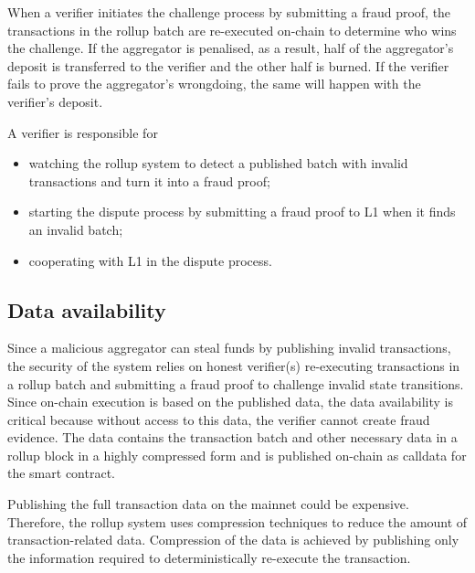 \documentclass{article}
\begin{document}
When a verifier initiates the challenge process by submitting a fraud proof, the transactions in the rollup batch are re-executed on-chain to determine who wins the challenge. If the aggregator is penalised, as a result, half of the aggregator's deposit is transferred to the verifier and the other half is burned. If the verifier fails to prove the aggregator's wrongdoing, the same will happen with the verifier's deposit.

A verifier is responsible for
\begin{itemize} 
\item watching the rollup system to detect a published batch with invalid transactions and turn it into a fraud proof;
\item starting the dispute process by submitting a fraud proof to L1 when it finds an invalid batch; 
\item cooperating with L1 in the dispute process.
\end{itemize}

\subsection{Data availability}
Since a malicious aggregator can steal funds by publishing invalid transactions, the security of the system relies on honest verifier(s) re-executing transactions in a rollup batch and submitting a fraud proof to challenge invalid state transitions. Since on-chain execution is based on the published data, the data availability is critical because without access to this data, the verifier cannot create fraud evidence. The data contains the transaction batch and other necessary data in a rollup block in a highly compressed form and is published on-chain as calldata for the smart contract.

Publishing the full transaction data on the mainnet could be expensive. Therefore, the rollup system uses compression techniques to reduce the amount of transaction-related data. Compression of the data is achieved by publishing only the information required to deterministically re-execute the transaction.
\end{document}
